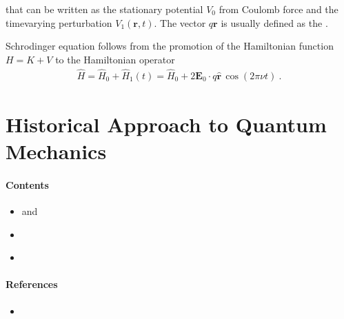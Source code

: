 \documentclass[letterpaper,10pt,english]{jupyterBook}
\begin{document}
\sphinxAtStartPar
that can be written as the stationary potential \(V_0\) from Coulomb force and the time\sphinxhyphen{}varying perturbation \(V_1(\mathbf{r},t)\). The vector \(q \mathbf{r}\) is usually defined as the .

\sphinxAtStartPar
Schrodinger equation follows from the promotion of the Hamiltonian function \(H = K + V\) to the Hamiltonian operator
\begin{equation*}
\begin{split}\hat{H} = \hat{H}_0 + \hat{H}_1(t) = \hat{H}_0 + 2 \mathbf{E}_0 \cdot q \hat{\mathbf{r}} \, \cos(2 \pi \nu t ) \ .\end{split}
\end{equation*}


\sphinxstepscope


\chapter{Historical Approach to Quantum Mechanics}
\label{\detokenize{ch/quantum-mechanics/history:historical-approach-to-quantum-mechanics}}\label{\detokenize{ch/quantum-mechanics/history:quantum-mechanics-history}}\label{\detokenize{ch/quantum-mechanics/history::doc}}\subsubsection*{Contents}
\begin{itemize}
\item {} 
\sphinxAtStartPar
{\hyperref[\detokenize{ch/quantum-mechanics/history/timeline:quantum-mechanics-history-timeline}]{}} and {\hyperref[\detokenize{ch/quantum-mechanics/history/topics:quantum-mechanics-history-topics}]{}}

\item {} 
\sphinxAtStartPar
{\hyperref[\detokenize{ch/quantum-mechanics/history/origin-matrix-mechanics:quantum-mehcanics-history-origin-matrix-mechanics}]{}}

\item {} 
\sphinxAtStartPar
{\hyperref[\detokenize{ch/quantum-mechanics/history/origin-wave-mechanics:quantum-mehcanics-history-origin-wave-mechanics}]{}}

\end{itemize}
\subsubsection*{References}
\begin{itemize}
\item {} 
\sphinxAtStartPar
{}

\end{itemize}
\end{document}
